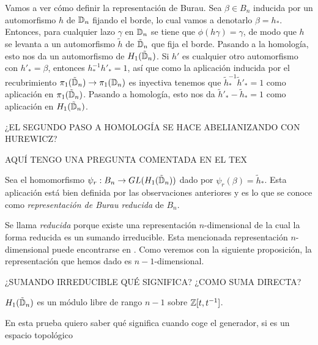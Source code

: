 \documentclass[TFG.tex]{subfiles}
\begin{document}
Vamos a ver cómo definir la representación de Burau. Sea $\beta\in B_n$ inducida por un automorfismo $h$ de $\mathbb{D}_n$ fijando el borde, lo cual vamos a denotarlo $\beta=h_*$. Entonces, para cualquier lazo $\gamma$ en $\mathbb{D}_n$ se tiene que $\phi(h\gamma)=\gamma$, de modo que $h$ se levanta a un automorfismo $\tilde{h}$ de $\tilde{\mathbb{D}}_n$ que fija el borde. Pasando a la homología, esto nos da un automorfismo de $H_1(\tilde{\mathbb{D}}_n)$. Si $h'$ es cualquier otro automorfismo con $h'_*=\beta$, entonces $h_*^{-1}h'_*=1$, así que como la aplicación inducida por el recubrimiento $\pi_1(\tilde{\mathbb{D}}_n)\to\pi_1(\mathbb{D}_n)$ es inyectiva \cite{Hatcher} tenemos que $\tilde{h}_*^{-1}\tilde{h}'_*=1$ como aplicación en $\pi_1(\tilde{\mathbb{D}}_n)$. Pasando a homología, esto nos da $\tilde{h}'_*-\tilde{h}_*=1$ como aplicación en $H_1(\tilde{\mathbb{D}}_n)$. 

¿EL SEGUNDO PASO A HOMOLOGÍA SE HACE ABELIANIZANDO CON HUREWICZ?

AQUÍ TENGO UNA PREGUNTA COMENTADA EN EL TEX


\begin{defi}
Sea el homomorfismo $\psi_r:B_n\to GL(H_1(\tilde{\mathbb{D}}_n))$ dado por $\psi_r(\beta)=\tilde{h}_*$. Esta aplicación está bien definida por las observaciones anteriores y es lo que se conoce como \emph{representación de Burau reducida} de $B_n$.
\end{defi}

Se llama \emph{reducida} porque existe una representación $n$-dimensional de la cual la forma reducida es un sumando irreducible. Esta mencionada representación $n$-dimensional puede encontrarse en \cite{thesis}. Como veremos con la siguiente proposición, la representación que hemos dado es $n-1$-dimensional.

¿SUMANDO IRREDUCIBLE QUÉ SIGNIFICA? ¿COMO SUMA DIRECTA?

\begin{prop}
$H_1(\tilde{\mathbb{D}}_n)$ es un módulo libre de rango $n-1$ sobre $\mathbb{Z}[t,t^{-1}]$.
\end{prop}
\begin{dem}
En esta prueba quiero saber qué significa cuando coge el generador, si es un espacio topológico
\end{dem}


\end{document}

